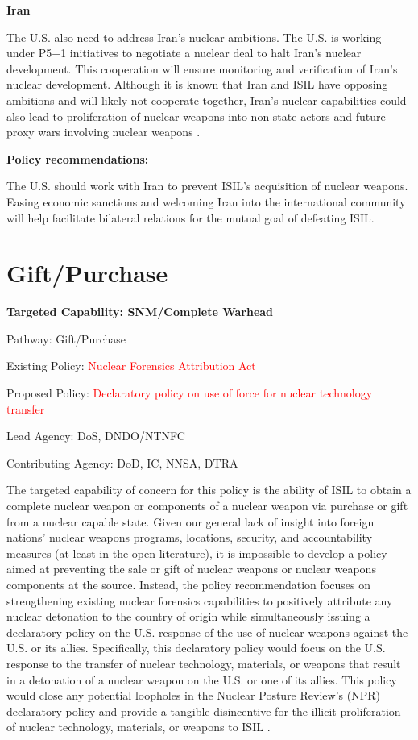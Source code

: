 \documentclass{report}
\begin{document}
\textbf{Iran}

The U.S. also need to address Iran's nuclear ambitions.  The U.S. is working under P5+1 initiatives to negotiate a nuclear deal to halt Iran's nuclear development. This cooperation will ensure monitoring and verification of Iran's nuclear development. Although it is known that Iran and ISIL have opposing ambitions and will likely not cooperate together, Iran's nuclear capabilities could also lead to proliferation of nuclear weapons into non-state actors and future proxy wars involving nuclear weapons \cite{Pfarrer2014}.

\textbf{Policy recommendations:}

The U.S. should work with Iran to prevent ISIL's acquisition of nuclear weapons. Easing economic sanctions and welcoming Iran into the international community will help facilitate bilateral relations for the mutual goal of defeating ISIL.  
 

 







\section{Gift/Purchase} \label{sec:purchase_gift}



\bfseries Targeted Capability: SNM/Complete Warhead

Pathway: Gift/Purchase

Existing Policy: \textcolor{red}{Nuclear Forensics Attribution Act}

Proposed Policy: \textcolor{red}{Declaratory policy on use of force for nuclear technology transfer}

Lead Agency: DoS, DNDO/NTNFC

Contributing Agency: DoD, IC, NNSA, DTRA \normalfont

The targeted capability of concern for this policy is the ability of ISIL to obtain a complete nuclear weapon or components of a nuclear weapon via purchase or gift from a nuclear capable state.  Given our general lack of insight into foreign nations' nuclear weapons programs, locations, security, and accountability measures (at least in the open literature), it is impossible to develop a policy aimed at preventing the sale or gift of nuclear weapons or nuclear weapons components at the source.  Instead, the policy recommendation focuses on strengthening existing nuclear forensics capabilities to positively attribute any nuclear detonation to the country of origin while simultaneously issuing a declaratory policy on the U.S. response of the use of nuclear weapons against the U.S. or its allies.  Specifically, this declaratory policy would focus on the U.S. response to the transfer of nuclear technology, materials, or weapons that result in a detonation of a nuclear weapon on the U.S. or one of its allies.  This policy would close any potential loopholes in the Nuclear Posture Review's (NPR) declaratory policy and provide a tangible disincentive for the illicit proliferation of nuclear technology, materials, or weapons to ISIL \cite{U.S.DepartmentofDefense2010}.  
\end{document}
